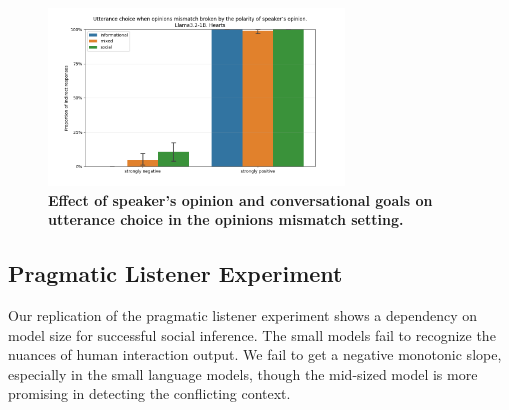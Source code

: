 \documentclass[11pt]{article}
\begin{document}
\begin{figure}[t]
    \centering
    \includegraphics[width=0.7\textwidth]{plots/speaker_experiment/llama3.2-1B_polarity.png}
    \caption{\textbf{Effect of speaker's opinion and conversational goals on utterance choice in the opinions mismatch setting.}}
    \label{fig:exp2-pol}
\end{figure}



\subsection{Pragmatic Listener Experiment}

Our replication of the pragmatic listener experiment shows a dependency on model size for successful social inference. The small models fail to recognize the nuances of human interaction output. We fail to get a negative monotonic slope, especially in the small language models, though the mid-sized model is more promising in detecting the conflicting context.

\end{document}
